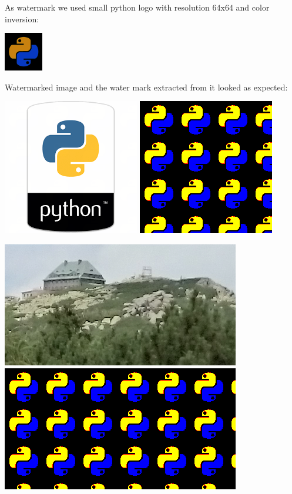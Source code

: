 \documentclass[a4paper, 12pt]{article}
\begin{document}
        As watermark we used small python logo with resolution 64x64 and color inversion:

        \begin{center}
            \includegraphics[scale=1.5]{watermark.png}
        \end{center}
    	
        Watermarked image and the water mark extracted from it looked as expected:

    	\includegraphics[scale=1.0]{python_lsb/watermarked_python.png}
    	\includegraphics[scale=1.0]{python_lsb/watermark_photo.png}

    	\includegraphics[scale=0.6]{photo_lsb/watermarked_photo.png}
    	\includegraphics[scale=0.6]{photo_lsb/watermark_photo.png}
        
\end{document}

